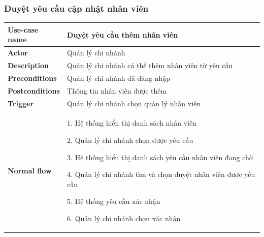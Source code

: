         \subsubsection{Duyệt yêu cầu cập nhật nhân viên}
            \begin{longtable}{| p{} | p{} |} 
                \hline
                    \textbf{Use-case name} 
                & 
                    Duyệt yêu cầu thêm nhân viên
                \\
                \hline
                    \textbf{Actor} 
                & 
                    Quản lý chi nhánh
                \\
                \hline
                    \textbf{Description} 
                & 
                    Quản lý chi nhánh có thể thêm nhân viên từ yêu cầu
                \\
                \hline
                    \textbf{Preconditions} 
                &
                    Quản lý chi nhánh đã đăng nhập
                \\
                \hline
                    \textbf{Postconditions} 
                & 
                    Thông tin nhân viên được thêm
                \\
                \hline
                    \textbf{Trigger} 
                & 
                    Quản lý chi nhánh chọn quản lý nhân viên
                \\
                \hline
                \begin{flushleft}
                    \textbf{Normal flow}
                \end{flushleft}
                & 
                1. Hệ thống hiển thị danh sách nhân viên
                    
                    2. Quản lý chi nhánh chọn được yêu cầu
                    
                    3. Hệ thống hiển thị danh sách yêu cầu nhân viên đang chờ
                    
                    4. Quản lý chi nhánh tìm và chọn duyệt nhân viên được yêu cầu
                    
                    5. Hệ thống yêu cầu xác nhận
                    
                    6. Quản lý chi nhánh chọn xác nhận
                    

\end{longtable}
